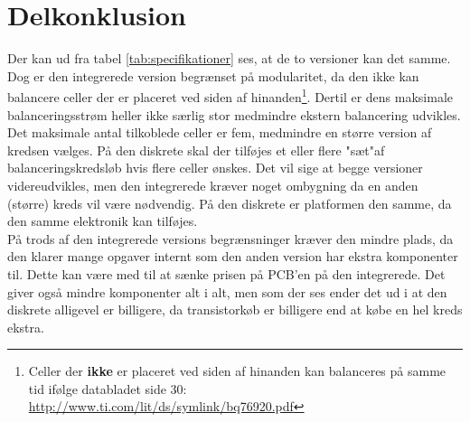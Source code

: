 \section{Delkonklusion}
Der kan ud fra tabel \ref{tab:specifikationer} ses, at de to versioner kan det samme. Dog er den integrerede version begrænset på modularitet, da den ikke kan balancere celler der er placeret ved siden af hinanden\footnote{Celler der \textbf{ikke} er placeret ved siden af hinanden kan balanceres på samme tid ifølge databladet side 30: \url{http://www.ti.com/lit/ds/symlink/bq76920.pdf}}. Dertil er dens maksimale balanceringsstrøm heller ikke særlig stor medmindre ekstern balancering udvikles. \\

Det maksimale antal tilkoblede celler er fem, medmindre en større version af kredsen vælges. På den diskrete skal der tilføjes et eller flere "sæt"\space af balanceringskredsløb hvis flere celler ønskes. Det vil sige at begge versioner videreudvikles, men den integrerede kræver noget ombygning da en anden (større) kreds vil være nødvendig. På den diskrete er platformen den samme, da den samme elektronik kan tilføjes.\\

På trods af den integrerede versions begrænsninger kræver den mindre plads, da den klarer mange opgaver internt som den anden version har ekstra komponenter til. Dette kan være med til at sænke prisen på PCB'en på den integrerede. Det giver også mindre komponenter alt i alt, men som der ses ender det ud i at den diskrete alligevel er billigere, da transistorkøb er billigere end at købe en hel kreds ekstra.\\